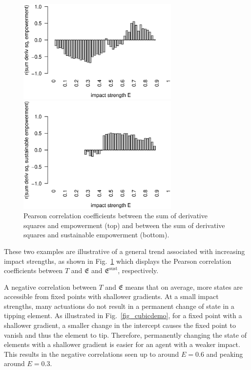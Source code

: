 \documentclass[conference]{IEEEtran}
\newcommand{\empowerment}{\ensuremath{\mathfrak{E}}}
\newcommand{\sustainableempowerment}{\ensuremath{\empowerment^{\mathrm{sust}}}}
\newcommand{\sumderivsquares}{\ensuremath{T}}
\newcommand{\impactstrength}{\ensuremath{E}}
\begin{document}
\begin{figure}

  \begin{center}

    \includegraphics[width=8cm]{n08_full_small_corr_dss_emp.eps}

    \includegraphics[width=8cm]{n08_full_small_corr_dss_empsust.eps}

  \end{center}

  \caption{Pearson correlation coefficients between the sum of derivative
    squares and empowerment (top) and between the sum of derivative
    squares and sustainable empowerment (bottom).}
  \label{fig_dssempcorr}

\end{figure}

These two examples are illustrative of a general trend associated with
increasing impact strengths, as shown in Fig.~\ref{fig_dssempcorr}
which displays the Pearson correlation coefficients between
$\sumderivsquares$ and $\empowerment$ and $\sustainableempowerment$,
respectively.

A negative correlation between $\sumderivsquares$ and $\empowerment$
means that on average, more states are accessible from fixed points
with shallower gradients. At a small impact strengths, many actuations
do not result in a permanent change of state in a tipping element. As
illustrated in Fig.~\ref{fig_cubicdemo}, for a fixed point with a
shallower gradient, a smaller change in the intercept causes the fixed
point to vanish and thus the element to tip. Therefore, permanently
changing the state of elements with a shallower gradient is easier for
an agent with a weaker impact. This results in the negative
correlations seen up to around $\impactstrength = 0.6$ and peaking around $\impactstrength = 0.3$.
\end{document}
